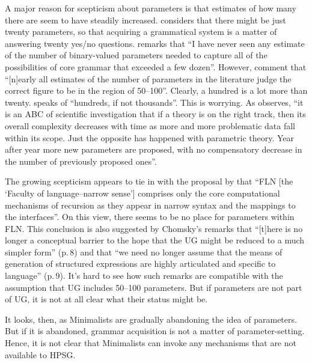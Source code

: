 \documentclass[output=paper
 	        ,biblatex
                ,babelshorthands
                ,newtxmath
                ,draftmode
                ,colorlinks, citecolor=brown
]{langscibook}
\begin{document}
A major reason for scepticism about parameters is that estimates of how many there are seem to have
steadily increased. \citet[]{Fodor2001b} considers that there might be just twenty parameters, so that
acquiring a grammatical system is a matter of answering twenty yes/no questions. \citet[]{Newmeyer2005a} remarks that ``I have never seen any estimate of the number of binary-valued
parameters needed to capture all of the possibilities of core grammar that exceeded a few
dozen''. However, \citet{RH2005a} comment that ``[n]early all estimates of the number of
parameters in the literature judge the correct figure to be in the region of 50--100''. Clearly, a
hundred is a lot more than twenty. \citet[Section~6.3]{Newmeyer2017a} speaks of ``hundreds, if not thousands''.
This is worrying. As \citet[]{Newmeyer2006a-u} observes, ``it
is an ABC of scientific investigation that if a theory is on the right track, then its overall
complexity decreases with time as more and more problematic data fall within its scope. Just the
opposite has happened with parametric theory. Year after year more new parameters are proposed, with
no compensatory decrease in the number of previously proposed ones''.

The growing scepticism appears to tie in with the proposal by \citet*[]{HCF2002a}
that ``FLN [the `Faculty of language--narrow sense'] comprises only the core computational mechanisms of
recursion as they appear in narrow syntax and the mappings to the interfaces''. On this view, there
seems to be no place for parameters within FLN. This conclusion is also suggested by Chomsky’s
remarks \citeyearpar{Chomsky2005a} that ``[t]here is no longer a conceptual barrier to the hope that the UG
might be reduced to a much simpler form'' (p.\,8) and that ``we need no longer assume that
the means of generation of structured expressions are highly articulated and specific to language''
(p.\,9). It’s hard to see how such remarks are compatible with the assumption that UG includes 50--100
parameters. But if parameters are not part of UG, it is not at all clear what their status might be.

It looks, then, as Minimalists are gradually abandoning the idea of parameters. But if it is
abandoned, grammar acquisition is not a matter of parameter-setting. Hence, it is not clear that
Minimalists can invoke any mechanisms that are not available to HPSG.
\end{document}
